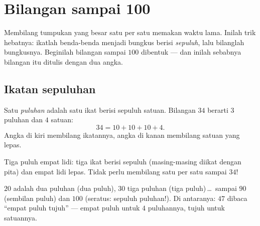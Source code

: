 \chapter{Bilangan sampai 100}\label{ch:g1:tens}

Membilang tumpukan yang besar satu per satu memakan waktu lama.
Inilah trik hebatnya: ikatlah benda-benda menjadi bungkus berisi
\emph{sepuluh}, lalu bilanglah bungkusnya. Beginilah bilangan sampai
$100$ dibentuk --- dan inilah sebabnya bilangan itu ditulis dengan
dua angka.

\section{Ikatan sepuluhan}

\begin{definition}\label{def:g1:tens:def}
Satu \emph{puluhan} adalah satu ikat berisi sepuluh satuan. Bilangan
$34$ berarti $3$ puluhan dan $4$ satuan:
\[
34 = 10 + 10 + 10 + 4 .
\]
Angka di kiri membilang ikatannya, angka di kanan membilang satuan
yang lepas.
\end{definition}

\begin{omfigure}

{\small Tiga puluh empat lidi: tiga ikat berisi sepuluh (masing-masing
diikat dengan pita) dan empat lidi lepas. Tidak perlu membilang satu
per satu sampai $34$!}
\end{omfigure}

\begin{example}\label{ex:g1:tens:reading}
$20$ adalah dua puluhan (dua puluh), $30$ tiga puluhan (tiga
puluh)\,\dots\ sampai $90$ (sembilan puluh) dan $100$ (seratus:
sepuluh puluhan!). Di antaranya: $47$ dibaca ``empat puluh tujuh''
--- empat puluh untuk $4$ puluhannya, tujuh untuk satuannya.
\end{example}

